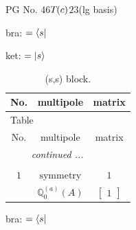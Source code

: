 \documentclass[fleqn,8pt,landscape]{jsarticle}
\begin{document}
\setcounter{MaxMatrixCols}{32}

\renewcommand{\tablename}{Table~}
\renewcommand{\figurename}{Figure~}
\begin{center}
\LARGE
PG No. 46\quad$T_{\rm }(c)$\quad$23$\quad[ cubic ] (lg basis)
\end{center}
bra: $=\bra{s}$

\noindent
ket: $=\ket{s}$
\renewcommand{\arraystretch}{1.6}
\begin{longtable}{ccc}
\caption{(s,s) block.}
 \\
 \hline \hline
No. & multipole & matrix \\ \hline \endfirsthead

\multicolumn{2}{l}{\tablename\ \thetable{}} \\
 \hline \hline
No. & multipole & matrix \\ \hline \endhead

 \hline \hline
\multicolumn{2}{r}{\footnotesize\it continued ...} \\ \endfoot

 \hline \hline
\multicolumn{2}{r}{} \\ \endlastfoot

$ 1 $ & $ \text{symmetry} $ & $ 1 $ \\
$  $ & $ \mathbb{Q}_{0}^{(a)}(A) $ & $ \begin{bmatrix} 1 \end{bmatrix} $ \\ \hline
\end{longtable}
bra: $=\bra{s}$
\end{document}
